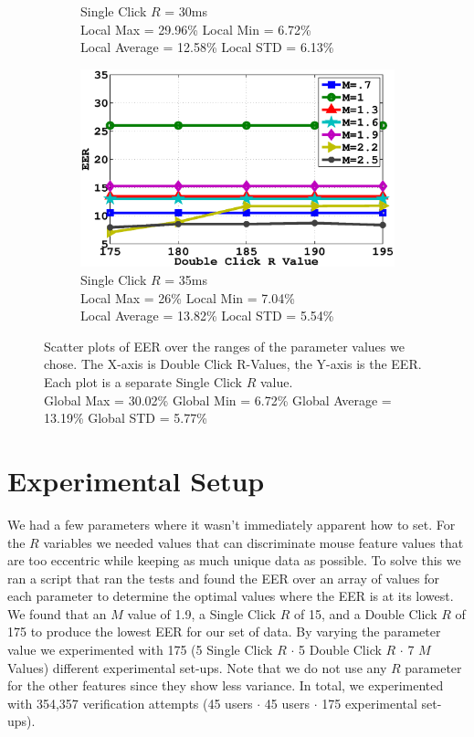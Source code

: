 \documentclass[conference]{IEEEtran}
\begin{document}
\begin{figure}
\begin{subfigure}{.5\textwidth}
  \caption{Single Click $R$ = 30ms \\Local Max = 29.96\% Local Min = 6.72\% \\Local Average = 12.58\% Local STD = 6.13\%}
  \label{fig:sfig3}
\end{subfigure}%
\begin{subfigure}{.5\textwidth}
  \centering
  \includegraphics[width=.8\linewidth]{35.eps}
  \caption{Single Click $R$ = 35ms \\Local Max = 26\% Local Min = 7.04\%\\Local Average = 13.82\% Local STD = 5.54\%}
  \label{fig:sfig4}
\end{subfigure}
\caption{Scatter plots of EER over the ranges of the parameter values we chose. The X-axis is Double Click R-Values, the Y-axis is the EER. Each plot is a separate Single Click $R$ value. \\Global Max = 30.02\% Global Min = 6.72\% Global Average = 13.19\% Global STD = 5.77\%}
\label{fig:fig}
\end{figure}


\section{Experimental Setup}
We had a few parameters where it wasn’t immediately apparent how to set. For the $R$ variables we needed values that can discriminate mouse feature values that are too eccentric while keeping as much unique data as possible. To solve this we ran a script that ran the tests and found the EER over an array of values for each parameter to determine the optimal values where the EER is at its lowest. We found that an $M$ value of 1.9, a Single Click $R$ of 15, and a Double Click $R$ of 175 to produce the lowest EER for our set of data. By varying the parameter value we experimented with 175 (5 Single Click $R$ $\cdot$ 5 Double Click $R$ $\cdot$ 7 $M$ Values) different experimental set-ups. Note that we do not use any $R$ parameter for the other features since they show less variance. In total, we experimented with 354,357 verification attempts (45 users $\cdot$ 45 users $\cdot$ 175 experimental set-ups).
\end{document}
